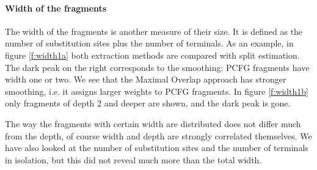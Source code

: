 \paragraph{Width of the fragments}
The width of the fragments is another measure of their size. It is defined as the number of substitution sites plus the number of terminals. As an example, in figure \ref{f:width1a} both extraction methods are compared with split estimation.  The dark peak on the right corresponds to the smoothing: PCFG fragments have width one or two. We see that the Maximal Overlap approach has stronger smoothing, i.e. it assigns larger weights to PCFG fragments. In figure \ref{f:width1b} only fragments of depth 2 and deeper are shown, and the dark peak is gone.

The way the fragments with certain width are distributed does not differ much from the depth, of course width and depth are strongly correlated themselves. We have also looked at the number of substitution sites and the number of terminals in isolation, but this did not reveal much more than the total width. 

